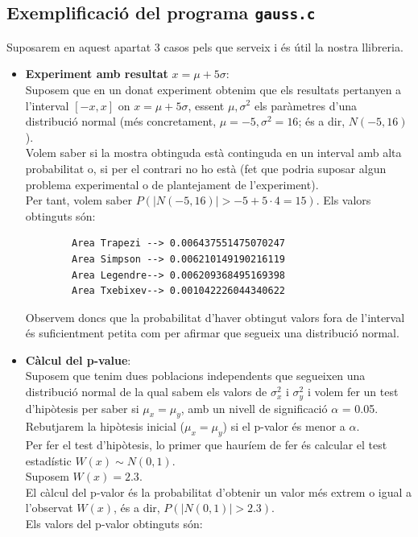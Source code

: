 \documentclass[12pt]{article}
\begin{document}
\subsection{Exemplificació del programa \texttt{gauss.c}}\label{gauss}
Suposarem en aquest apartat 3 casos pels que serveix i és útil la nostra llibreria.
\begin{itemize}
    \item\textbf{Experiment amb resultat} $x=\mu+5\sigma$:\\
    Suposem que en un donat experiment obtenim que els resultats pertanyen a l'interval $[-x,x]$ on $x=\mu+5\sigma$, essent $\mu,\sigma^2$ els paràmetres d'una distribució normal (més concretament, $\mu=-5, \sigma^2 = 16$; és a dir, $N(-5,16)$).\\
    Volem saber si la mostra obtinguda està continguda en un interval amb alta probabilitat o, si per el contrari no ho està (fet que podria suposar algun problema experimental o de plantejament de l'experiment).\\
    Per tant, volem saber $P(|N(-5,16)|> -5 + 5\cdot 4 = 15)$.
    Els valors obtinguts són:
    \begin{verbatim}
        Area Trapezi --> 0.006437551475070247
        Area Simpson --> 0.006210149190216119
        Area Legendre--> 0.006209368495169398
        Area Txebixev--> 0.001042226044340622
    \end{verbatim}
    Observem doncs que la probabilitat d'haver obtingut valors fora de l'interval és suficientment petita com per afirmar que segueix una distribució normal.
    \newpage
    \item \textbf{Càlcul del p-value}:\\
    Suposem que tenim dues poblacions independents que segueixen una distribució normal de la qual sabem els valors de $\sigma_x^2$ i $\sigma_y^2$ i volem fer un test d'hipòtesis per saber si $\mu_x = \mu_y$, amb un nivell de significació $\alpha$ = 0.05.\\
     Rebutjarem la hipòtesis inicial ($\mu_x = \mu_y$) si el p-valor és menor a $\alpha$.\\
    Per fer el test d'hipòtesis, lo primer que hauríem de fer és calcular el test estadístic $W(x) \sim N(0,1)$.\\ 
    Suposem $W(x) = 2.3$.\\
    El càlcul del p-valor és la probabilitat d'obtenir un valor més extrem o igual a l'observat $W(x)$, és a dir, $P(|N(0,1)|> 2.3)$.\\
    Els valors del p-valor obtinguts són:

\end{itemize}
\end{document}
